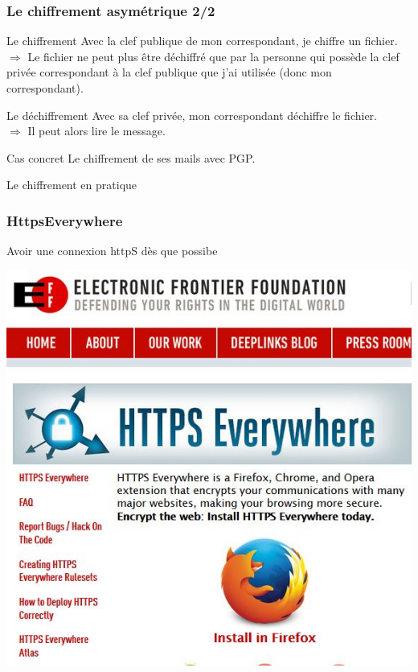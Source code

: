 \documentclass{beamer}
\begin{document}
\begin{frame}
\frametitle{Le chiffrement asymétrique 2/2}

\begin{block}{Le chiffrement}
Avec la clef publique de mon correspondant, je chiffre  un fichier.
\\$\Rightarrow$ Le fichier ne peut plus être déchiffré que par la personne qui possède la clef privée correspondant à la clef publique que j'ai utilisée (donc mon correspondant).
\end{block}

\begin{block}{Le déchiffrement}
Avec sa clef privée,  mon correspondant déchiffre le fichier.
\\
$\Rightarrow$ Il peut alors lire le message.
\end{block}

\begin{block}{Cas concret}
Le chiffrement de ses mails avec PGP.
\end{block}
\end{frame}

\begin{frame}
\begin{center}
\Huge{Le chiffrement en pratique}
\end{center}
\end{frame}

\begin{frame}
\frametitle{HttpsEverywhere}

Avoir une connexion httpS dès que possibe
\begin{center}
\includegraphics[scale=0.5] {./images/httpseverywhere.jpg}
\end{center}
\end{frame}
\end{document}
